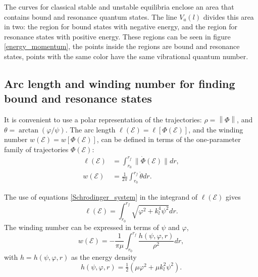 \documentclass[%
 aip,
 numerical,
 jcp,
 floatfix,
rsi,%
amsmath,amssymb,
reprint,%
author-year%
]{revtex4-1}
\begin{document}
The curves for classical stable and unstable equilibria enclose an area that contains bound and resonance quantum states. The line $V_a(l)$ divides this area in two: the region for bound states with negative energy, and the region for resonance states with positive energy. These regions can be seen in figure \ref{energy_momentum}, the points inside the regions are bound and resonance states, points with the same color have the same vibrational quantum number.

\subsection{Arc length and winding number for finding bound and resonance states}

It is convenient to use a polar representation of the trajectories: $\rho=\left\|\Phi\right\|$, and $\theta= \arctan{(\varphi/\psi)}$. The arc length $\ell(\mathcal{E})=\ell[\Phi(\mathcal{E})]$, and the winding number $w(\mathcal{E})=w[\Phi(\mathcal{E})]$, can be defined in terms of the one-parameter family of trajectories $\Phi(\mathcal{E})$:
\begin{subequations}\label{winding_arclenght}
\begin{align}
 \ell(\mathcal{E}) &=\int_{r_0}^{r_f}{\|\dot{\Phi}(\mathcal{E})\| dr},\\
    w(\mathcal{E}) &=\frac{1}{2\pi}\int_{r_0}^{r_f}{\dot\theta dr}.
\end{align}
\end{subequations}

The use of equations \eqref{Schrodinger_system} in the integrand of $\ell(\mathcal{E})$ gives
\begin{equation}\label{arclength}
    \ell(\mathcal{E})=\int_{r_0}^{r_f}\sqrt{\varphi^2+k_l^4\psi^2}dr.
\end{equation}
The winding number can be expressed in terms of $\psi$ and $\varphi$,
\begin{equation}\label{winding}
    w(\mathcal{E})=-\frac{1}{\pi\mu}\int_{r_0}^{r_f}\frac{h(\psi,\varphi,r)}{\rho^2}dr,
\end{equation}
with $h=h(\psi,\varphi,r)$ as the energy density
\begin{equation}\label{energy_density}
    h(\psi,\varphi,r)=\tfrac{1}{2}\left(\mu\varphi^2+\mu k_l^2\psi^2\right).
\end{equation}
\end{document}
